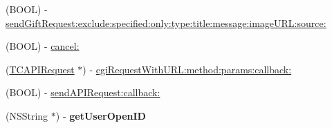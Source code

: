 \begin{DoxyCompactItemize}
\item 
(B\+O\+OL) -\/ \mbox{\hyperlink{interface_tencent_o_auth_a109d82c5c2ee0f4161dbbbe7ae0e3544}{send\+Gift\+Request\+:exclude\+:specified\+:only\+:type\+:title\+:message\+:image\+U\+R\+L\+:source\+:}}
\item 
(B\+O\+OL) -\/ \mbox{\hyperlink{interface_tencent_o_auth_a03709122ebf51c3b78bdd95bf07e505b}{cancel\+:}}
\item 
(\mbox{\hyperlink{interface_t_c_a_p_i_request}{T\+C\+A\+P\+I\+Request}} $\ast$) -\/ \mbox{\hyperlink{interface_tencent_o_auth_a3b1f8572362e0577eaf748dd183dab98}{cgi\+Request\+With\+U\+R\+L\+:method\+:params\+:callback\+:}}
\item 
(B\+O\+OL) -\/ \mbox{\hyperlink{interface_tencent_o_auth_a0d2819557e5b7be2de54f21419718763}{send\+A\+P\+I\+Request\+:callback\+:}}
\item 
\mbox{\label{interface_tencent_o_auth_a86568108ba898f81cf03462b07fead17}} 
(N\+S\+String $\ast$) -\/ {\bfseries get\+User\+Open\+ID}
\end{DoxyCompactItemize}
